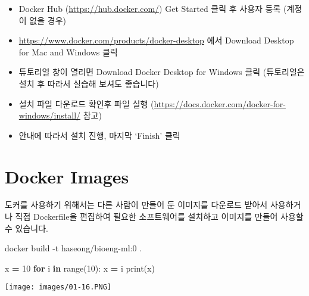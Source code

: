\documentclass[]{book}
\newenvironment{Shaded}{\begin{snugshade}}{\end{snugshade}}
\newcommand{\KeywordTok}[1]{\textcolor[rgb]{0.13,0.29,0.53}{\textbf{#1}}}
\newcommand{\DecValTok}[1]{\textcolor[rgb]{0.00,0.00,0.81}{#1}}
\newcommand{\ControlFlowTok}[1]{\textcolor[rgb]{0.13,0.29,0.53}{\textbf{#1}}}
\newcommand{\OperatorTok}[1]{\textcolor[rgb]{0.81,0.36,0.00}{\textbf{#1}}}
\newcommand{\BuiltInTok}[1]{#1}
\newcommand{\ExtensionTok}[1]{#1}
\newcommand{\NormalTok}[1]{#1}
\providecommand{\tightlist}{%
  \setlength{\itemsep}{0pt}\setlength{\parskip}{0pt}}
\begin{document}
\begin{itemize}
\tightlist
\item
  Docker Hub (\url{https://hub.docker.com/}) Get Started 클릭 후 사용자 등록 (계정이 없을 경우)
\item
  \url{https://www.docker.com/products/docker-desktop} 에서 Download Desktop for Mac and Windows 클릭
\item
  튜토리얼 창이 열리면 Download Docker Desktop for Windows 클릭 (튜토리얼은 설치 후 따라서 실습해 보셔도 좋습니다)
\item
  설치 파일 다운로드 확인후 파일 실행 (\url{https://docs.docker.com/docker-for-windows/install/} 참고)
\item
  안내에 따라서 설치 진행, 마지막 `Finish' 클릭
\end{itemize}

\hypertarget{docker-images}{%
\section{Docker Images}\label{docker-images}}

도커를 사용하기 위해서는 다른 사람이 만들어 둔 이미지를 다운로드 받아서 사용하거나 직접 Dockerfile을 편집하여 필요한 소프트웨어를 설치하고 이미지를 만들어 사용할 수 있습니다.

\begin{Shaded}
\begin{Highlighting}[]
\ExtensionTok{docker}\NormalTok{ build -t haseong/bioeng-ml:0 .}
\end{Highlighting}
\end{Shaded}

\begin{Shaded}
\begin{Highlighting}[]
\NormalTok{x }\OperatorTok{=} \DecValTok{10}
\ControlFlowTok{for}\NormalTok{ i }\KeywordTok{in} \BuiltInTok{range}\NormalTok{(}\DecValTok{10}\NormalTok{):}
\NormalTok{  x }\OperatorTok{=}\NormalTok{ i}
\BuiltInTok{print}\NormalTok{(x)}
\end{Highlighting}
\end{Shaded}

\texttt{[image: images/01-16.PNG]}


\end{document}
